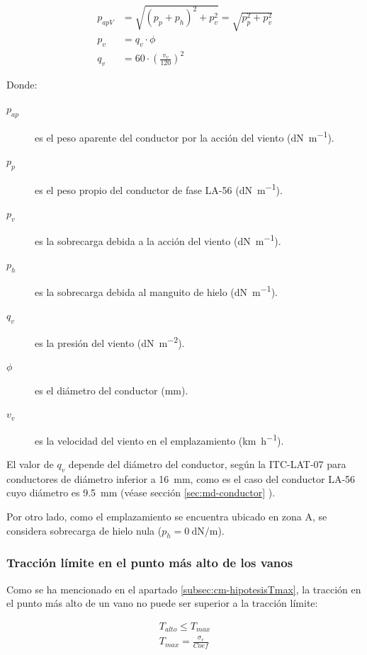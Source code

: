 \begin{align}
    p_{apV} &= \sqrt{(p_p + p_h)^2 + p_v^2} = \sqrt{p_p^2 + p_v^2}
    \label{eq:peso-aparenteV} \\[0.5em]
    p_v &= q_v \cdot \phi
    \label{eq:sobrecarga-viento} \\[0.5em]
    q_v &= 60 \cdot (\frac{v_v}{120})^2
    \label{eq:presion-viento}
\end{align}

Donde:
\begin{description}
  \item[$p_{ap}$] es el peso aparente del conductor por la acción del viento (\si{\deca\newton\per\meter}).
  \item[$p_p$] es el peso propio del conductor de fase LA-56 (\si{\deca\newton\per\meter}).
  \item[$p_v$] es la sobrecarga debida a la acción del viento (\si{\deca\newton\per\meter}).
  \item[$p_h$] es la sobrecarga debida al manguito de hielo (\si{\deca\newton\per\meter}).
  \item[$q_v$] es la presión del viento (\si{\deca\newton\per\meter\squared}).
  \item[$\phi$] es el diámetro del conductor (\si{\milli\meter}).
  \item[$v_v$] es la velocidad del viento en el emplazamiento (\si{\kilo\meter\per\hour}).
\end{description}

El valor de $q_v$ depende del diámetro del conductor, según la ITC-LAT-07 para conductores de diámetro inferior a \SI{16}{\milli\meter}, como es el caso del conductor LA-56 cuyo diámetro es \SI{9.5}{\milli\meter} (véase sección \ref{sec:md-conductor} ).

Por otro lado, como el emplazamiento se encuentra ubicado en zona A, se considera sobrecarga de hielo nula ($p_h=\SI{0}{\deca\newton\per\meter}$).

\subsubsection{Tracción límite en el punto más alto de los vanos}
\label{subsubsec:hipotesisTmax-Tlim}
Como se ha mencionado en el apartado \ref{subsec:cm-hipotesisTmax}, la tracción en el punto más alto de un vano no puede ser superior a la tracción límite:

\begin{align}
T_{alto} \leq T_{max}
\label{eq:Talto} \\[0.5em]
T_{max} = \frac{\sigma_r}{Coef}
\label{eq:Tmax}
\end{align}


